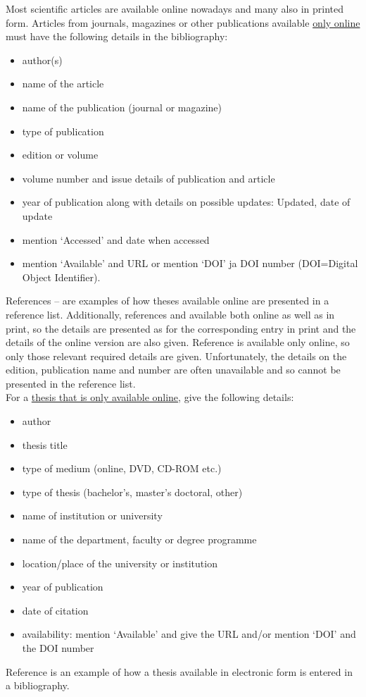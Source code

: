 \documentclass[english, 12pt, a4paper, sci, utf8, a-2b, online]{aaltothesis}
\begin{document}
Most scientific articles are available online nowadays and many also in printed 
form. Articles from journals, magazines or other publications available 
\underline{only online} must have the following details in the bibliography:
\begin{itemize}
\setlength{\itemsep}{-3pt}
\item[--]author(s)
\item[--]name of the article
\item[--]name of the publication (journal or magazine)
\item[--]type of publication
\item[--]edition or volume
\item[--]volume number and issue details of publication and article
\item[--]year of publication along with details on possible updates: Updated, 
date of update
\item[--]mention `Accessed' and date when accessed
\item[--]mention `Available' and URL or mention `DOI' ja DOI number (DOI=Digital
Object Identifier).
\end{itemize}
References \cite{Ribeiro}--\cite{kone} are examples of how theses available 
online are presented in a reference list. Additionally, references 
\cite{Ribeiro} and \cite{Stieber} available both online as well as in print, so 
the details are presented as for the corresponding entry in print and the 
details of the online version are also given. Reference \cite{kone} is 
available only online, so only those relevant required details are given.
Unfortunately, the details on the edition, publication name and number are 
often unavailable and so cannot be presented in the reference list.\\

\noindent
For a \underline{thesis that is only available online}, give the following 
details:
\begin{itemize}
\setlength{\itemsep}{-3pt}
\item[--]author
\item[--]thesis title
\item[--]type of medium (online, DVD, CD-ROM etc.)
\item[--]type of thesis (bachelor's, master's doctoral, other)
\item[--]name of institution or university
\item[--]name of the department, faculty or degree programme
\item[--]location/place of the university or institution
\item[--]year of publication
\item[--]date of citation
\item[--]availability: mention `Available' and give the URL and/or mention `DOI'
and the DOI number
\end{itemize}
Reference \cite{Adida} is an example of how a thesis available in electronic 
form is entered in a bibliography.\\
\end{document}
